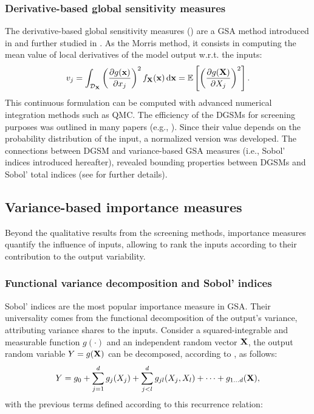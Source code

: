 \subsubsection{Derivative-based global sensitivity measures}

The derivative-based global sensitivity measures () are a GSA method introduced in \citet{sobol_1995_DGSM} and further studied in \citet{kucherenko_2009_DGSM}. 
As the Morris method, it consists in computing the mean value of local derivatives of the model output w.r.t. the inputs: 
\begin{equation}
    v_j = \int_{\mathcal{D}_{{\bf X}}} \left(\frac{\partial g({\bf x})}{\partial x_j}\right)^2 f_{{\bf X}}({\bf x}) \, \mathrm{d} {\bf x} = \mathbb{E}\left[\left(\frac{\partial g({\bf X})}{\partial X_j}\right)^2\right].
\end{equation}
This continuous formulation can be computed with advanced numerical integration methods such as QMC. 
The efficiency of the DGSMs for screening purposes was outlined in many papers (e.g., \citealp{kucherenko_iooss_2017}). 
Since their value depends on the probability distribution of the input, a normalized version was developed. 
The connections between DGSM and variance-based GSA measures (i.e., Sobol' indices introduced hereafter), revealed bounding properties between DGSMs and Sobol' total indices (see \citealp{roustant_2017} for further details).

\subsection{Variance-based importance measures}

Beyond the qualitative results from the screening methods, importance measures quantify the influence of inputs, allowing to rank the inputs according to their contribution to the output variability.  


\subsubsection{Functional variance decomposition and Sobol' indices}
Sobol' indices are the most popular importance measure in GSA. 
Their universality comes from the functional decomposition of the output's variance, attributing variance shares to the inputs. 
Consider a squared-integrable and measurable function $g(\cdot)$ and an independent random vector ${\bf X}$, 
the output random variable $Y = g({\bf X})$ can be decomposed, according to \citet{hoeffding_1948}, as follows: 
\begin{equation}
    Y = g_0 + \sum_{j=1}^{d} g_j(X_j) + \sum_{j<l}^{d} g_{jl}(X_j, X_l) + \dots + g_{1 \dots d}({\bf X}),
    \label{eq:hoeffding}
\end{equation}
with the previous terms defined according to this recurrence relation:  

